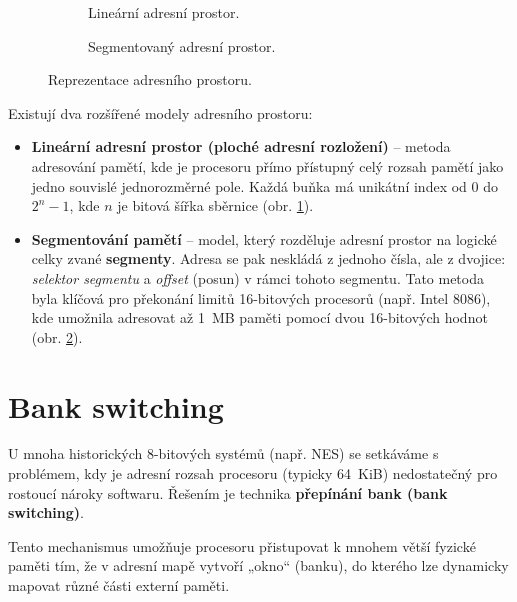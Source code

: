 \begin{figure}[htbp]
    \centering
    \begin{subfigure}{0.45\textwidth}
        
        \caption{Lineární adresní prostor.}
        \label{fig:flat_memory}
    \end{subfigure}
    \quad
    \begin{subfigure}{0.45\textwidth}
        
        \caption{Segmentovaný adresní prostor.}
        \label{fig:segmented_memory}
    \end{subfigure}
    \caption{Reprezentace adresního prostoru.}
    \label{fig:address_space}
\end{figure}

Existují dva rozšířené modely adresního prostoru:

\begin{itemize}
    \item \textbf{Lineární adresní prostor (ploché adresní rozložení)} -- metoda adresování pamětí,
        kde je procesoru přímo přístupný celý rozsah pamětí jako jedno souvislé jednorozměrné pole.
        Každá buňka má unikátní index od $0$ do $2^n - 1$, kde $n$ je bitová šířka sběrnice (obr.
        \ref{fig:flat_memory}).
    \item \textbf{Segmentování pamětí} -- model, který rozděluje adresní prostor na logické celky zvané
        \textbf{segmenty}. Adresa se pak neskládá z jednoho čísla, ale z dvojice: \textit{selektor
        segmentu} a \textit{offset} (posun) v rámci tohoto segmentu. Tato metoda byla klíčová pro
        překonání limitů 16-bitových procesorů (např. Intel 8086), kde umožnila adresovat až 1~MB
        paměti pomocí dvou 16-bitových hodnot (obr. \ref{fig:segmented_memory}).
\end{itemize}

\section{Bank switching}

U mnoha historických 8-bitových systémů (např. NES) se setkáváme s problémem, kdy je
adresní rozsah procesoru (typicky 64~KiB) nedostatečný pro rostoucí nároky softwaru. Řešením je
technika \textbf{přepínání bank (bank switching)}.

Tento mechanismus umožňuje procesoru přistupovat k mnohem větší fyzické paměti tím, že v adresní
mapě vytvoří „okno“ (banku), do kterého lze dynamicky mapovat různé části externí paměti.

